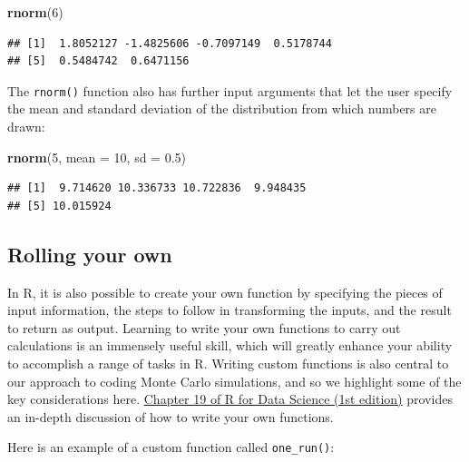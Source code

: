 \documentclass[
]{book}
\newenvironment{Shaded}{\begin{snugshade}}{\end{snugshade}}
\newcommand{\AttributeTok}[1]{\textcolor[rgb]{0.13,0.29,0.53}{#1}}
\newcommand{\ControlFlowTok}[1]{\textcolor[rgb]{0.13,0.29,0.53}{\textbf{#1}}}
\newcommand{\DecValTok}[1]{\textcolor[rgb]{0.00,0.00,0.81}{#1}}
\newcommand{\FloatTok}[1]{\textcolor[rgb]{0.00,0.00,0.81}{#1}}
\newcommand{\FunctionTok}[1]{\textcolor[rgb]{0.13,0.29,0.53}{\textbf{#1}}}
\newcommand{\NormalTok}[1]{#1}
\newcommand{\OtherTok}[1]{\textcolor[rgb]{0.56,0.35,0.01}{#1}}
\newcommand{\SpecialCharTok}[1]{\textcolor[rgb]{0.81,0.36,0.00}{\textbf{#1}}}
\begin{document}
\begin{Shaded}
\begin{Highlighting}[]
\FunctionTok{rnorm}\NormalTok{(}\DecValTok{6}\NormalTok{)}
\end{Highlighting}
\end{Shaded}

\begin{verbatim}
## [1]  1.8052127 -1.4825606 -0.7097149  0.5178744
## [5]  0.5484742  0.6471156
\end{verbatim}

The \texttt{rnorm()} function also has further input arguments that let the user specify the mean and standard deviation of the distribution from which numbers are drawn:

\begin{Shaded}
\begin{Highlighting}[]
\FunctionTok{rnorm}\NormalTok{(}\DecValTok{5}\NormalTok{, }\AttributeTok{mean =} \DecValTok{10}\NormalTok{, }\AttributeTok{sd =} \FloatTok{0.5}\NormalTok{)}
\end{Highlighting}
\end{Shaded}

\begin{verbatim}
## [1]  9.714620 10.336733 10.722836  9.948435
## [5] 10.015924
\end{verbatim}

\subsection{Rolling your own}\label{rolling-your-own}

In R, it is also possible to create your own function by specifying the pieces of input information, the steps to follow in transforming the inputs, and the result to return as output.
Learning to write your own functions to carry out calculations is an immensely useful skill, which will greatly enhance your ability to accomplish a range of tasks in R.
Writing custom functions is also central to our approach to coding Monte Carlo simulations, and so we highlight some of the key considerations here.
\href{https://r4ds.had.co.nz/functions.html}{Chapter 19 of R for Data Science (1st edition)} provides an in-depth discussion of how to write your own functions.

Here is an example of a custom function called \texttt{one\_run()}:

\begin{Shaded}
\end{Shaded}
\end{document}
